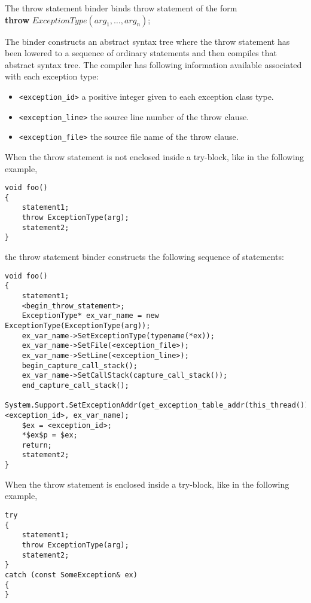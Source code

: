 \documentclass[a4paper,oneside,11pt]{book}
\theoremstyle{definition}
\begin{document}
The throw statement binder binds throw statement of the form\\ \textbf{throw} $ExceptionType(arg_1, \ldots, arg_n)$;
\begin{flushleft}
The binder constructs an abstract syntax tree where the throw statement has been lowered to a sequence of ordinary statements and
then compiles that abstract syntax tree.
The compiler has following information available associated with each exception type:

\begin{itemize}
\item
\verb|<exception_id>| a positive integer given to each exception class type.
\item
\verb|<exception_line>| the source line number of the throw clause.
\item
\verb|<exception_file>| the source file name of the throw clause.
\end{itemize}

When the throw statement is not enclosed inside a try-block, like in the following example,

\lstset{language=Cmajor}
\begin{lstlisting}[frame=trBL]
void foo()
{
    statement1;
    throw ExceptionType(arg);
    statement2;
}
\end{lstlisting}

the throw statement binder constructs the following sequence of statements:

\lstset{language=Cmajor}
\begin{lstlisting}[frame=trBL]
void foo()
{
    statement1;
    <begin_throw_statement>;
    ExceptionType* ex_var_name = new ExceptionType(ExceptionType(arg));
    ex_var_name->SetExceptionType(typename(*ex));
    ex_var_name->SetFile(<exception_file>);
    ex_var_name->SetLine(<exception_line>);
    begin_capture_call_stack();
    ex_var_name->SetCallStack(capture_call_stack());
    end_capture_call_stack();
    System.Support.SetExceptionAddr(get_exception_table_addr(this_thread()), <exception_id>, ex_var_name);
    $ex = <exception_id>;
    *$ex$p = $ex;
    return;
    statement2;
}
\end{lstlisting}

When the throw statement is enclosed inside a try-block, like in the following example,

\lstset{language=Cmajor}
\begin{lstlisting}[frame=trBL]
try
{
    statement1;
    throw ExceptionType(arg);
    statement2;
}
catch (const SomeException& ex)
{
}
\end{lstlisting}


\end{flushleft}
\end{document}
